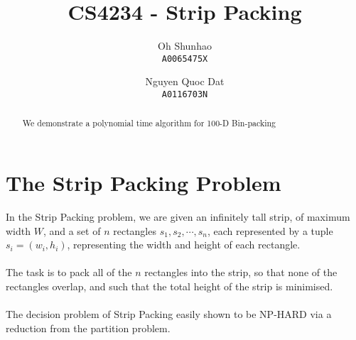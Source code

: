 \documentclass{article}
\begin{document}
\author{
Oh Shunhao\\
  \texttt{A0065475X}
  \and
Nguyen Quoc Dat\\
  \texttt{A0116703N}
}
\title{CS4234 - Strip Packing}
\date{}

\maketitle

\begin{abstract}
We demonstrate a polynomial time algorithm for 100-D Bin-packing
\end{abstract}

\section{The Strip Packing Problem}
In the Strip Packing problem, we are given an infinitely tall strip, of maximum width $W$, and a set of $n$ rectangles $s_1,s_2,\cdots,s_n$, each represented by a tuple $s_i = (w_i,h_i)$, representing the width and height of each rectangle.\\
\\
The task is to pack all of the $n$ rectangles into the strip, so that none of the rectangles overlap, and such that the total height of the strip is minimised.\\
\\
The decision problem of Strip Packing easily shown to be NP-HARD via a reduction from the partition problem.\\
\end{document}
